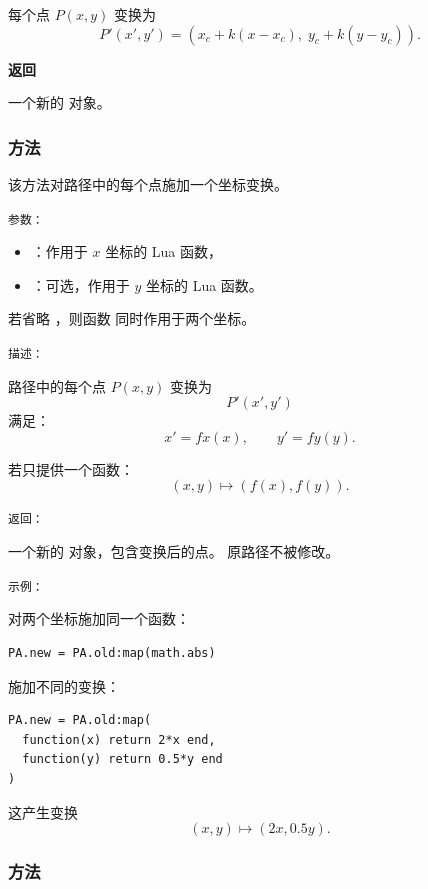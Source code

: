 每个点 $P(x,y)$ 变换为
\[
P'(x',y') = (x_c + k(x - x_c),\; y_c + k(y - y_c)).
\]

\medskip

\textbf{返回}

一个新的  对象。

\subsubsection{方法 }
\label{ssub:path_map}

该方法对路径中的每个点施加一个坐标变换。

\medskip

\texttt{参数： }
\begin{itemize}
  \item {}：作用于 $x$ 坐标的 Lua 函数，
  \item {}：可选，作用于 $y$ 坐标的 Lua 函数。
\end{itemize}

若省略 ，则函数  同时作用于两个坐标。

\medskip

\texttt{描述： }

路径中的每个点 $P(x,y)$ 变换为
\[
P'(x',y')
\]
满足：
\[
x' = fx(x),
\qquad
y' = fy(y).
\]

若只提供一个函数：
\[
(x,y) \mapsto (f(x), f(y)).
\]

\medskip

\texttt{返回： }

一个新的  对象，包含变换后的点。
原路径不被修改。

\medskip

\texttt{示例： }

对两个坐标施加同一个函数：

\begin{verbatim}
PA.new = PA.old:map(math.abs)
\end{verbatim}

施加不同的变换：

\begin{verbatim}
PA.new = PA.old:map(
  function(x) return 2*x end,
  function(y) return 0.5*y end
)
\end{verbatim}

这产生变换
\[
(x,y) \mapsto (2x, 0.5y).
\]




\subsubsection{方法 }
\label{ssub:method_tkzmeth_path_rotate}

